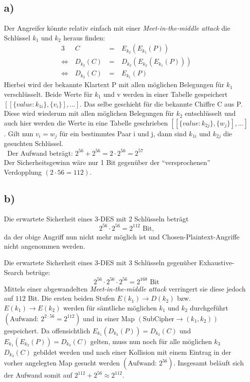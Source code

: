 \documentclass[ngerman]{fbi-aufgabenblatt}
\begin{document}
	\setcounter{section}{0}

	
	\subsection*{a)}
	Der Angreifer könnte relativ einfach mit einer \textit{Meet-in-the-middle attack} die Schlüssel $k_{1}$ und $k_{2}$ heraus finden:
	\begin{alignat*}{3}
		& \ C \ &=& \ E_{k_2}\left( E_{k_1}\left( P \right)  \right)\\
		\Leftrightarrow& \ D_{k_2} \left( C\right) \ &=& \ D_{k_2} \left( E_{k_2} \left( E_{k_1} \left( P \right) \right) \right)  \\
		\Leftrightarrow& \ D_{k_2} \left( C \right) \ &=& \ E_{k_1} \left( P \right)  
	\end{alignat*}
	Hierbei wird der bekannte Klartext P mit allen möglichen Belegungen für $k_{1}$ verschlüsselt. Beide Werte für $k_{1}$ und v werden in einer Tabelle gespeichert $[[\{value: k_{1i}\} ,\{v_{i}\}], ... ]$. Das selbe geschieht für die bekannte Chiffre C aus P. Diese wird wiederum mit allen möglichen Belegungen für $k_{2}$ entschlüsselt und auch hier werden die Werte in eine Tabelle geschrieben $[[\{value: k_{2j}\} ,\{w_{j}\}], ... ]$ . Gilt nun $v_{i} = w_{j}$ für ein bestimmtes Paar i und j, dann sind $k_{1i}$ und $k_{2j}$ die gesuchten Schlüssel.\\\
	Der Aufwand beträgt:
	$2^{56}+2^{56} =2\cdot 2^{56} =2^{57}$\\
	
	Der Sicherheitsgewinn wäre nur 1 Bit gegenüber der \enquote{versprochenen} Verdopplung $\left( 2\cdot 56 = 112\right) $.
		
	\subsection*{b)}
	Die erwartete Sicherheit eines 3-DES mit 2 Schlüsseln beträgt \[ 2^{56}\cdot2^{56} =2^{112} \text{ Bit,} \] da der obige Angriff nun nicht mehr möglich ist und Chosen-Plaintext-Angriffe nicht angenommen werden.	
	
	Die erwartete Sicherheit eines 3-DES mit 3 Schlüsseln gegenüber Exhaustive-Search betrüge:
	\[ 2^{56}\cdot2^{56}\cdot2^{56} =2^{168} \text{ Bit} \]
	Mittels einer abgewandelten \textit{Meet-in-the-middle attack} verringert sie diese jedoch auf $112$ Bit. Die ersten beiden Stufen $E\left( k_1 \right) \rightarrow D\left( k_2 \right)$  bzw. $E\left( k_1 \right) \rightarrow E\left( k_2 \right)$ werden für sämtliche möglichen $k_1$ und $k_2$ durchgeführt $\left(\text{Aufwand: } 2^{2\cdot56} = 2^{112} \right) $ und in einer Map $\left(\text{SubCipher} \rightarrow  \left( k_1, k_2\right)\right)$ gespeichert. Da offensichtlich $E_{k_1} \left( D_{k_2} \left( P \right) \right) = D_{k_3}\left( C \right)$ und $E_{k_1} \left( E_{k_2} \left( P \right) \right) = D_{k_3}\left( C \right)$ gelten, muss nun noch für alle möglichen $k_3$  $D_{k_3}\left( C \right)$ gebildet werden und nach einer Kollision mit einem Eintrag in der vorher angelegten Map gesucht werden $\left(\text{Aufwand: } 2^{56}\right) $. Insgesamt beläuft sich der Aufwand somit auf $2^{112}+2^{56} \approx 2^{112}$. 
	
\end{document}
